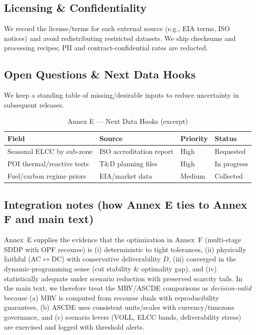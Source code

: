 \documentclass[11pt]{article}
\numberwithin{equation}{section}
\theoremstyle{definition}
\theoremstyle{remark}
\begin{document}
\subsection{ Licensing \& Confidentiality}
\label{E11}
We record the license/terms for each external source (e.g., EIA terms, ISO notices) and avoid redistributing restricted datasets. We ship checksums and processing recipes; PII and contract-confidential rates are redacted.

\subsection{ Open Questions \& Next Data Hooks}
\label{E12}
We keep a standing table of missing/desirable inputs to reduce uncertainty in subsequent releases.

\begin{table}[h]
\centering
\caption{Annex E — Next Data Hooks (excerpt)}
\label{tab:datahooks}
\begin{tabular}{@{}llll@{}}
\toprule
\textbf{Field} & \textbf{Source} & \textbf{Priority} & \textbf{Status} \\
\midrule
Seasonal ELCC by sub-zone & ISO accreditation report & High & Requested \\
POI thermal/reactive tests & T\&D planning files & High & In progress \\
Fuel/carbon regime priors & EIA/market data & Medium & Collected \\
\bottomrule
\end{tabular}
\end{table}

\subsection*{Integration notes (how Annex E ties to Annex F and main text)}
Annex~E supplies the evidence that the optimization in Annex~F (multi-stage SDDP with OPF recourse) is (i) deterministic to tight tolerances, (ii) physically faithful (AC$\leftrightarrow$DC) with conservative deliverability $D$, (iii) converged in the dynamic-programming sense (cut stability \& optimality gap), and (iv) statistically adequate under scenario reduction with preserved scarcity tails. In the main text, we therefore treat the MRV/ASCDE comparisons as \emph{decision-valid} because (a) MRV is computed from recourse duals with reproducibility guarantees, (b) ASCDE uses consistent units/scales with currency/timezone governance, and (c) scenario levers (VOLL, ELCC bands, deliverability stress) are exercised and logged with threshold alerts.
\end{document}
